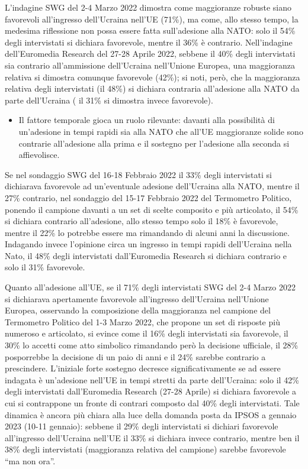 \documentclass[
  openany]{book}
\providecommand{\tightlist}{%
  \setlength{\itemsep}{0pt}\setlength{\parskip}{0pt}}
\begin{document}
L'indagine SWG del 2-4 Marzo 2022 dimostra come maggioranze robuste siano favorevoli all'ingresso dell'Ucraina nell'UE (71\%), ma come, allo stesso tempo, la medesima riflessione non possa essere fatta sull'adesione alla NATO: solo il 54\% degli intervistati si dichiara favorevole, mentre il 36\% è contrario. Nell'indagine dell'Euromedia Research del 27-28 Aprile 2022, sebbene il 40\% degli intervistati sia contrario all'ammissione dell'Ucraina nell'Unione Europea, una maggioranza relativa si dimostra comunque favorevole (42\%); si noti, però, che la maggioranza relativa degli intervistati (il 48\%) si dichiara contraria all'adesione alla NATO da parte dell'Ucraina ( il 31\% si dimostra invece favorevole).

\begin{itemize}
\tightlist
\item
  Il fattore temporale gioca un ruolo rilevante: davanti alla possibilità di un'adesione in tempi rapidi sia alla NATO che all'UE maggioranze solide sono contrarie all'adesione alla prima e il sostegno per l'adesione alla seconda si affievolisce.
\end{itemize}

Se nel sondaggio SWG del 16-18 Febbraio 2022 il 33\% degli intervistati si dichiarava favorevole ad un'eventuale adesione dell'Ucraina alla NATO, mentre il 27\% contrario, nel sondaggio del 15-17 Febbraio 2022 del Termometro Politico, ponendo il campione davanti a un set di scelte composito e più articolato, il 54\% si dichiara contrario all'adesione, allo stesso tempo solo il 18\% è favorevole, mentre il 22\% lo potrebbe essere ma rimandando di alcuni anni la discussione. Indagando invece l'opinione circa un ingresso in tempi rapidi dell'Ucraina nella Nato, il 48\% degli intervistati dall'Euromedia Research si dichiara contrario e solo il 31\% favorevole.

Quanto all'adesione all'UE, se il 71\% degli intervistati SWG del 2-4 Marzo 2022 si dichiarava apertamente favorevole all'ingresso dell'Ucraina nell'Unione Europea, osservando la composizione della maggioranza nel campione del Termometro Politico del 1-3 Marzo 2022, che propone un set di risposte più numeroso e articolato, si evince come il 16\% degli intervistati sia favorevole, il 30\% lo accetti come atto simbolico rimandando però la decisione ufficiale, il 28\% posporrebbe la decisione di un paio di anni e il 24\% sarebbe contrario a prescindere. L'iniziale forte sostegno decresce significativamente se ad essere indagata è un'adesione nell'UE in tempi stretti da parte dell'Ucraina: solo il 42\% degli intervistati dall'Euromedia Research (27-28 Aprile) si dichiara favorevole a cui si contrappone un fronte di contrari composto dal 40\% degli intervistati. Tale dinamica è ancora più chiara alla luce della domanda posta da IPSOS a gennaio 2023 (10-11 gennaio): sebbene il 29\% degli intervistati si dichiari favorevole all'ingresso dell'Ucraina nell'UE il 33\% si dichiara invece contrario, mentre ben il 38\% degli intervistati (maggioranza relativa del campione) sarebbe favorevole ``ma non ora''.
\end{document}
